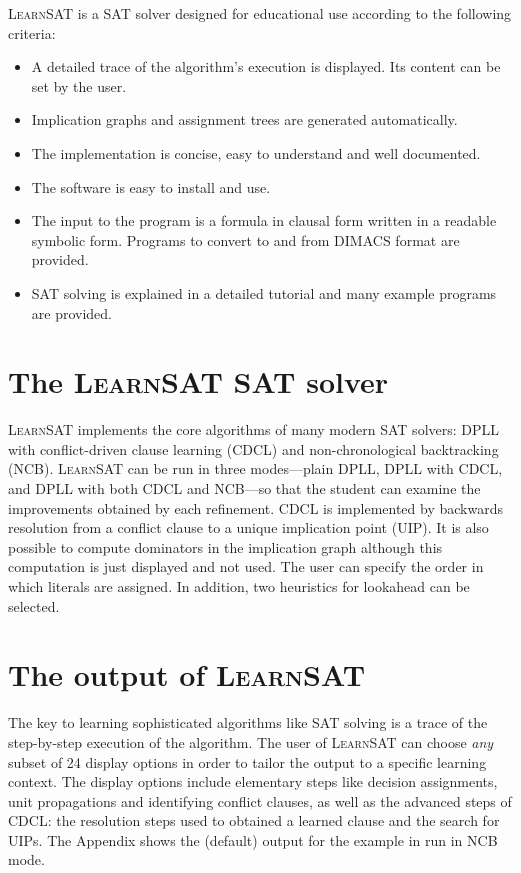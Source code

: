 \documentclass[11pt]{article}
\newcommand*{\ls}{\textsc{LearnSAT}}
\begin{document}
\ls{} is a SAT solver designed for educational use according to the following criteria:

\begin{itemize}
\item A detailed trace of the algorithm's execution is displayed. Its content can be set by the user.

\item Implication graphs and assignment trees are generated automatically.

\item The implementation is concise, easy to understand and well documented. 

\item The software is easy to install and use.

\item The input to the program is a formula in clausal form written in a
readable symbolic form. Programs to convert to and from DIMACS format are provided.

\item SAT solving is explained in a detailed tutorial and many example programs are provided.
\end{itemize}


\section{The \ls{} SAT solver}

\ls{} implements the core algorithms of many modern SAT
solvers: DPLL with conflict-driven clause learning (CDCL) and
non-chro\-no\-log\-i\-cal backtracking (NCB). \ls{} can be
run in three modes---plain DPLL, DPLL with CDCL, and DPLL with both CDCL
and NCB---so that the student can examine the improvements obtained by
each refinement. CDCL is implemented by backwards resolution from a conflict
clause to a unique implication point (UIP). It is also possible to
compute dominators in the implication graph although this computation is
just displayed and not used. The user can specify the order in which literals are assigned. In addition, two heuristics for lookahead can be selected.

\section{The output of \ls{}}

The key to learning sophisticated algorithms like SAT solving is a trace
of the step-by-step execution of the algorithm. The user of
\ls{} can choose \emph{any} subset of 24 display options in
order to tailor the output to a specific learning context. The display
options include elementary steps like decision assignments, unit
propagations and identifying conflict clauses, as well as the advanced steps of
CDCL: the resolution steps used to obtained a learned clause and the
search for UIPs. The Appendix shows the (default) output for the example
in \cite{mlm} run in NCB mode.
\end{document}
